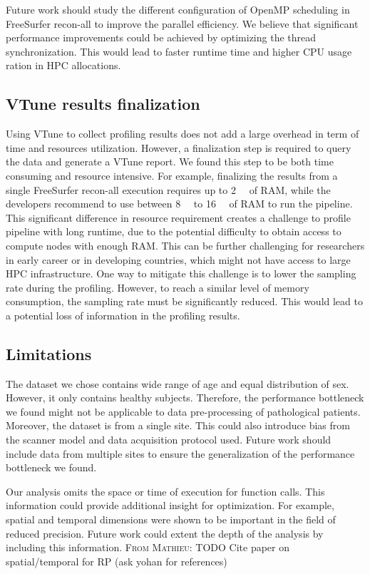 \documentclass[conference]{IEEEtran}
\newcommand{\MD}[1]{\color{magenta}\textsc{From Mathieu: }#1\color{black}}
\begin{document}
Future work should study the different configuration of OpenMP scheduling in FreeSurfer recon-all to improve the parallel efficiency. We believe that significant performance improvements could be achieved by optimizing the thread synchronization. This would lead to faster runtime time and higher CPU usage ration in HPC allocations.
			
\subsection{VTune results finalization}
Using VTune to collect profiling results does not add a large overhead in term of time and resources utilization. However, a finalization step is required to query the data and generate a VTune report. We found this step to be both time consuming and resource intensive. For example, finalizing the results from a single FreeSurfer recon-all execution requires up to \SI{2}{\tera\byte} of RAM, while the developers recommend to use between \SI{8}{\giga\byte} to \SI{16}{\giga\byte} of RAM to run the pipeline. This significant difference in resource requirement creates a challenge to profile pipeline with long runtime, due to the potential difficulty to obtain access to compute nodes with enough RAM. This can be further challenging for researchers in early career or in developing countries, which might not have access to large HPC infrastructure.
One way to mitigate this challenge is to lower the sampling rate during the profiling. However, to reach a similar level of memory consumption, the sampling rate must be significantly reduced. This would lead to a potential loss of information in the profiling results.

\subsection{Limitations}
The dataset we chose contains wide range of age and equal distribution of sex. However, it only contains healthy subjects. Therefore, the performance bottleneck we found might not be applicable to data pre-processing of pathological patients. Moreover, the dataset is from a single site. This could also introduce bias from the scanner model and data acquisition protocol used. Future work should include data from multiple sites to ensure the generalization of the performance bottleneck we found.
			
Our analysis omits the space or time of execution for function calls. This information could provide additional insight for optimization. For example, spatial and temporal dimensions were shown to be important in the field of reduced precision. Future work could extent the depth of the analysis by including this information.
\MD{TODO Cite paper on spatial/temporal for RP (ask yohan for references)}
			
\end{document}
